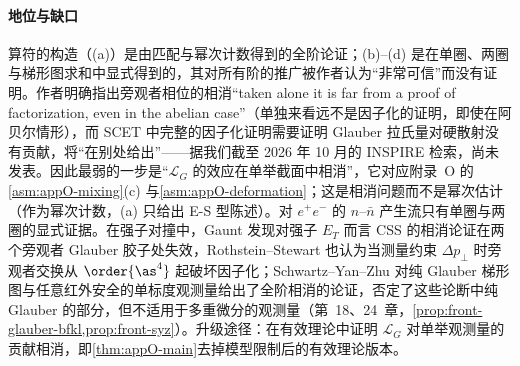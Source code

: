 \paragraph{地位与缺口}
算符的构造（(a)）是由匹配与幂次计数得到的全阶论证；(b)--(d) 是在单圈、两圈与梯形图求和中显式得到的，其对所有阶的推广被作者认为“非常可信”而没有证明\cite[第~10~节]{RothsteinStewart2016}。作者明确指出旁观者相位的相消“taken alone it is far from a proof of factorization, even in the abelian case”（单独来看远不是因子化的证明，即使在阿贝尔情形）\cite[第~11.1~节]{RothsteinStewart2016}，而 SCET 中完整的因子化证明需要证明 Glauber 拉氏量对硬散射没有贡献，将“在别处给出”\cite[第~11~节]{RothsteinStewart2016}——据我们截至 2026 年 10 月的 INSPIRE 检索，尚未发表。因此最弱的一步是“$\mathcal L_G$ 的效应在单举截面中相消”，它对应附录~O 的\cref{asm:appO-mixing}(c) 与\cref{asm:appO-deformation}；这是相消问题而不是幂次估计（作为幂次计数，(a) 只给出 E-S 型陈述）。对 $e^+e^-$ 的 $n$–$\bar n$ 产生流只有单圈与两圈的显式证据\cite[第~10~节]{RothsteinStewart2016}。在强子对撞中，Gaunt 发现对强子 $E_T$ 而言 CSS 的相消论证在两个旁观者 Glauber 胶子处失效\cite{Gaunt2014}，Rothstein--Stewart 也认为当测量约束 $\Delta p_\perp$ 时旁观者交换从 $\order{\as^4}$ 起破坏因子化\cite[第~11.1~节]{RothsteinStewart2016}；Schwartz--Yan--Zhu 对纯 Glauber 梯形图与任意红外安全的单标度观测量给出了全阶相消的论证，否定了这些论断中纯 Glauber 的部分，但不适用于多重微分的观测量\cite{Schwartz:2018obd}（第~18、24~章，\cref{prop:front-glauber-bfkl,prop:front-syz}）。升级途径：在有效理论中证明 $\mathcal L_G$ 对单举观测量的贡献相消，即\cref{thm:appO-main}去掉模型限制后的有效理论版本。

